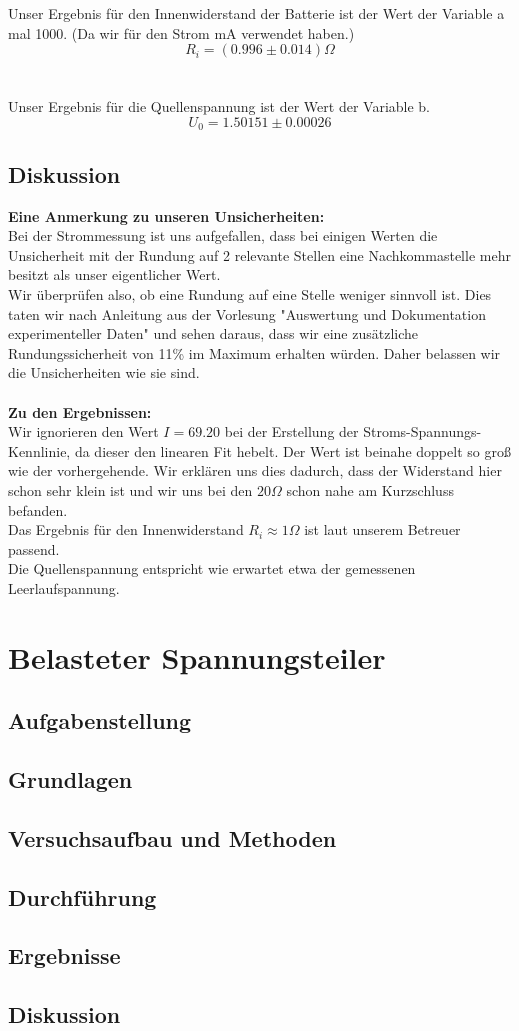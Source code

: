 \documentclass{article}
\begin{document}
\newpage
Unser Ergebnis für den Innenwiderstand der Batterie ist der Wert der Variable a mal 1000. (Da wir für den Strom mA verwendet haben.)\\
$$\boxed{R_i=(0.996 \pm 0.014)\Omega}$$\\
\\
Unser Ergebnis für die Quellenspannung ist der Wert der Variable b. \\
$$\boxed{U_0=1.50151 \pm 0.00026}$$


\subsection{Diskussion}
\textbf{Eine Anmerkung zu unseren Unsicherheiten:}\\
Bei der Strommessung ist uns aufgefallen, dass bei einigen Werten die Unsicherheit mit der Rundung auf 2 relevante Stellen eine Nachkommastelle mehr besitzt als unser eigentlicher Wert.\\
Wir überprüfen also, ob eine Rundung auf eine Stelle weniger sinnvoll ist. Dies taten wir nach Anleitung aus der Vorlesung "Auswertung und Dokumentation experimenteller Daten" und sehen daraus, dass wir eine zusätzliche Rundungssicherheit von 11\% im Maximum erhalten würden. Daher belassen wir die Unsicherheiten wie sie sind.\\
\\
\textbf{Zu den Ergebnissen:}\\
Wir ignorieren den Wert $I=69.20$ bei der Erstellung der Stroms-Spannungs-Kennlinie, da dieser den linearen Fit hebelt. Der Wert ist beinahe doppelt so groß wie der vorhergehende. Wir erklären uns dies dadurch, dass der Widerstand hier schon sehr klein ist und wir uns bei den $20\Omega$ schon nahe am Kurzschluss befanden.
\\
Das Ergebnis für den Innenwiderstand $R_i\approx 1\Omega$ ist laut unserem Betreuer passend.\\
Die Quellenspannung entspricht wie erwartet etwa der gemessenen Leerlaufspannung.

\newpage

\section{Belasteter Spannungsteiler}

\subsection{Aufgabenstellung}
\subsection{Grundlagen}
\subsection{Versuchsaufbau und Methoden}
\subsection{Durchführung}
\subsection{Ergebnisse}
\subsection{Diskussion}
\end{document}
